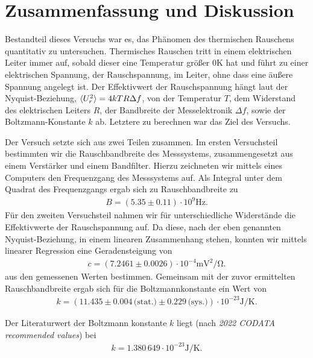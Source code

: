 \section{Zusammenfassung und Diskussion}

Bestandteil dieses Versuchs war es, das Phänomen des thermischen Rauschens quantitativ zu untersuchen. Thermisches Rauschen tritt in einem elektrischen Leiter immer auf, sobald dieser eine Temperatur größer $0\si{\kelvin}$ hat und führt zu einer elektrischen Spannung, der Rauschspannung, im Leiter, ohne dass eine äußere Spannung angelegt ist. Der Effektivwert der Rauschspannung hängt laut der Nyquist-Beziehung, $\langle U_r^2 \rangle = 4kTR\Delta f$, von der Temperatur $T$, dem Widerstand des elektrischen Leiters $R$, der Bandbreite der Messelektronik $\Delta f$, sowie der Boltzmann-Konstante $k$ ab. Letztere zu berechnen war das Ziel des Versuchs.

Der Versuch setzte sich aus zwei Teilen zusammen. Im ersten Versuchsteil bestimmten wir die Rauschbandbreite des Messsystems, zusammengesetzt aus einem Verstärker und einem Bandfilter. Hierzu zeichneten wir mittels eines Computers den Frequenzgang des Messsystems auf. Als Integral unter dem Quadrat des Frequenzgangs ergab sich zu Rauschbandbreite zu
\begin{align*}
  B = (5.35 \pm 0.11) \cdot 10^9 \si{\hertz}.
\end{align*}
Für den zweiten Versuchsteil nahmen wir für unterschiedliche Widerstände die Effektivwerte der Rauschspannung auf. Da diese, nach der eben genannten Nyquist-Beziehung, in einem linearen Zusammenhang stehen, konnten wir mittels linearer Regression eine Geradensteigung von
\begin{align*}
  c = (7.2461 \pm 0.0026) \cdot 10^{-4} \si{\milli\volt\squared\per\ohm}.
\end{align*}
aus den gemessenen Werten bestimmen. Gemeinsam mit der zuvor ermittelten Rauschbandbreite ergab sich für die Boltzmannkonstante ein Wert von
\begin{align*}
  k = (11.435 \pm 0.004\, \text{(stat.)} \pm 0.229\, \text{(sys.)}) \cdot 10^{-23} \si{\joule\per\kelvin}.
\end{align*}

Der Literaturwert der Boltzmann konstante $k$ liegt (nach \textit{2022 CODATA recommended values}) bei
\begin{align*}
  k = 1.380\, 649 \cdot 10^{-23} \si{\joule\per\kelvin}.
\end{align*}

